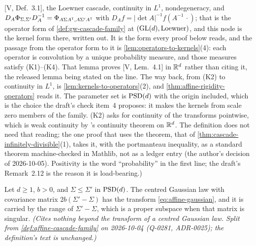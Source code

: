 \begin{definition}
{[V, Def.~3.1], the Loewner cascade, continuity in $L^1$, nondegeneracy, and
$D_A\Phi_{\Sigma,\Sigma'}D_A^{-1} = \Phi_{A\Sigma A^{\mathsf{T}},A\Sigma'A^{\mathsf{T}}}$ with
$D_Af = |\det A|^{-1}f(A^{-1}\,\cdot)$; that is the operator form of \ref{def:gw-cascade-family} at
$(\mathrm{GL}(d), \text{Loewner})$, and this node is the kernel form there, written out. It is the form every
proof below reads, and the
passage from the operator form to it is \ref{lem:operators-to-kernels}(4): each operator is
convolution by a unique probability measure, and those measures satisfy (K1)--(K4). That lemma
proves [V, Lem.~4.1] in $\mathbb{R}^d$ rather than citing it, the released lemma being stated on the
line. The way back, from (K2) to continuity in $L^1$, is \ref{lem:kernels-to-operators}(2), and
\ref{thm:affine-rigidity-operators} reads it.
The parameter set is $\mathrm{PSD}(d)$ with the
origin included, which is the choice the draft's check item~4 proposes: it makes the kernels from scale zero members of the family. (K2) asks for continuity of the transforms pointwise, which is
weak continuity by \Levy's continuity theorem on $\mathbb{R}^d$. The definition does not need that reading;
the one proof that uses the theorem, that of \ref{thm:cascade-infinitely-divisible}(1), takes it,
with the portmanteau inequality, as a standard theorem machine-checked in Mathlib, not as a ledger
entry (the author's decision of 2026-10-05). Positivity is the word
``probability'' in the first line; the draft's Remark~2.12 is the reason it is load-bearing.)}
\end{definition}

\begin{lemma}
\label{lem:affine-gaussian-transform}
\leanok
Let $d \ge 1$, $b > 0$, and $\Sigma \le \Sigma'$ in $\mathrm{PSD}(d)$. The centred Gaussian law with
covariance matrix $2b(\Sigma' - \Sigma)$ has the transform \ref{eq:affine-gaussian}, and it is
carried by the range of $\Sigma' - \Sigma$, which is a proper subspace when that matrix is
singular.
\statusT\quad\emph{(Cites nothing beyond the transform of a centred Gaussian law. Split from
\ref{def:affine-cascade-family} on 2026-10-04 (Q-0281, ADR-0025); the definition's text is
unchanged.)}
\end{lemma}

